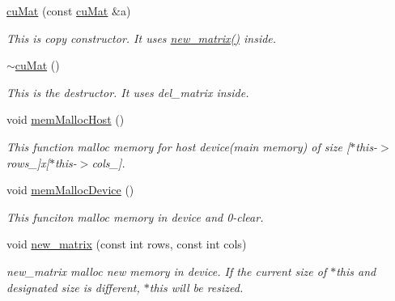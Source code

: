 \begin{DoxyCompactItemize}
\mbox{\hyperlink{classcuMat_a1caa95916affc357b436b09f30f7c234}{cu\+Mat}} (const \mbox{\hyperlink{classcuMat}{cu\+Mat}} \&a)
\begin{DoxyCompactList}\small\item\em This is copy constructor. It uses \mbox{\hyperlink{classcuMat_a9029f495582d01345ab6513a670e5222}{new\+\_\+matrix()}} inside. \end{DoxyCompactList}\item 
\mbox{\label{classcuMat_aa540003b558fdd97dd5b9f3f96a163fc}} 
\mbox{\hyperlink{classcuMat_aa540003b558fdd97dd5b9f3f96a163fc}{$\sim$cu\+Mat}} ()
\begin{DoxyCompactList}\small\item\em This is the destructor. It uses del\+\_\+matrix inside. \end{DoxyCompactList}\item 
\mbox{\label{classcuMat_a242d2c78e868c92ea3639b58bc1582ac}} 
void \mbox{\hyperlink{classcuMat_a242d2c78e868c92ea3639b58bc1582ac}{mem\+Malloc\+Host}} ()
\begin{DoxyCompactList}\small\item\em This function malloc memory for host device(main memory) of size \mbox{[}$\ast$this-\/$>$rows\+\_\+\mbox{]}x\mbox{[}$\ast$this-\/$>$cols\+\_\+\mbox{]}. \end{DoxyCompactList}\item 
\mbox{\label{classcuMat_a13b0f57d8796ea59c32112d4a9a33d10}} 
void \mbox{\hyperlink{classcuMat_a13b0f57d8796ea59c32112d4a9a33d10}{mem\+Malloc\+Device}} ()
\begin{DoxyCompactList}\small\item\em This funciton malloc memory in device and 0-\/clear. \end{DoxyCompactList}\item 
void \mbox{\hyperlink{classcuMat_a9029f495582d01345ab6513a670e5222}{new\+\_\+matrix}} (const int rows, const int cols)
\begin{DoxyCompactList}\small\item\em new\+\_\+matrix malloc new memory in device. If the current size of $\ast$this and designated size is different, $\ast$this will be resized. \end{DoxyCompactList}\item 
\mbox{\label{classcuMat_a76fc37b5688d34d9c5b4f55957b8d8ab}} 

\end{DoxyCompactItemize}
